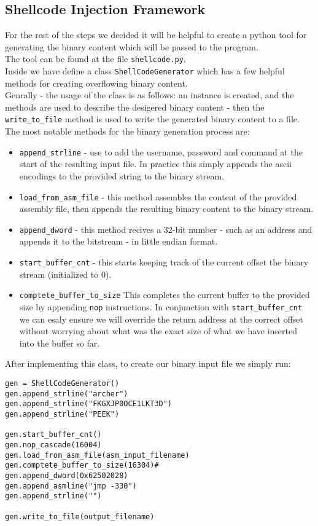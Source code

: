 \documentclass{article}
\begin{document}
\subsection{Shellcode Injection Framework}
For the rest of the steps we decided it will be helpful to create a
python tool for generating the binary content which will be passed to the program.\\
The tool can be found at the file \texttt{shellcode.py}.\\

Inside we have define a class \texttt{ShellCodeGenerator} which has a few
helpful methods for creating overflowing binary content.\\
Genrally - the usage of the class is as follows: an instance is created,
and the methods are used to describe the desigered binary content -
then the \texttt{write\_to\_file} method is used to write 
the generated binary content to a file.\\

The most notable methods for the binary generation process are:
\begin{itemize}
    \item \texttt{append\_strline} - use to add the username, password and command at the start of the resulting input file.
    In practice this simply appends the ascii encodings to the provided string to the binary stream.
    \item \texttt{load\_from\_asm\_file} - this method assembles the content of the provided
    assembly file, then appends the resulting binary content to the binary stream.
    \item \texttt{append\_dword} - this method recives a 32-bit number - such as an address
    and appends it to the bitstream - in little endian format.
    \item \texttt{start\_buffer\_cnt} - this starts keeping track of the current offset
    the binary stream (initialized to 0).
    \item \texttt{comptete\_buffer\_to\_size} This completes the current 
    buffer to the provided size by appending \texttt{nop} instructions.
    In conjunction with \texttt{start\_buffer\_cnt} we can esaly ensure
    we will override the return address at the correct offset without worrying about
    what was the exact size of what we have inserted into the buffer so far.
\end{itemize}

After implementing this class, to create our binary input file we simply run:
\begin{lstlisting}
gen = ShellCodeGenerator()
gen.append_strline("archer")
gen.append_strline("FKGXJP0OCE1LKT3D")
gen.append_strline("PEEK")

gen.start_buffer_cnt()
gen.nop_cascade(16004)
gen.load_from_asm_file(asm_input_filename)
gen.comptete_buffer_to_size(16304)#
gen.append_dword(0x62502028)
gen.append_asmline("jmp -330")
gen.append_strline("")

gen.write_to_file(output_filename)
\end{lstlisting}
\end{document}
